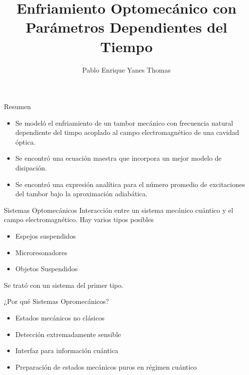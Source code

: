 \documentclass[10pt]{beamer}
\author{Pablo Enrique Yanes Thomas}
\title{Enfriamiento Optomecánico con Parámetros Dependientes del Tiempo}
\institute{IIMAS}
\begin{document}
\begin{frame}
\titlepage
\end{frame}


\begin{frame}{Resumen}

\begin{itemize}
\item Se modeló el enfriamiento de un tambor mecánico con frecuencia natural dependiente del timpo acoplado al campo electromagnético de una cavidad óptica.

\item Se encontró una  ecuación maestra que incorpora un mejor modelo de disipación.

\item Se encontró una expresión analítica para el número promedio de excitaciones del tambor bajo la aproximación adiabática.
\end{itemize}

\end{frame}

\begin{frame}{Sistemas Optomecánicos}
Interacción entre un sistema mecánico cuántico y el campo electromagnético. Hay varios tipos posibles

\begin{itemize}
\item Espejos suspendidos
\item Microresonadores
\item Objetos Suspendidos
\end{itemize}

Se trató con un sistema del primer tipo.

\end{frame}

\begin{frame}{¿Por qué Sistemas Opromecánicos?}

\begin{itemize}
\item Estados mecánicos no clásicos
\item Detección extremadamente sensible
\item Interfaz para información cuántica
\item Preparación de estados mecánicos puros en régimen cuántico 
\end{itemize}


\end{frame}
\end{document}
